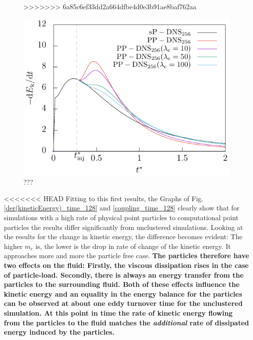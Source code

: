 \documentclass[11pt,a4paper,openany,oneside,parskip=half*]{article}
\begin{document}
\begin{figure}[h]
\begin{minipage}{0.5\textwidth}
	\label{kineticEnergy_time_128}
>>>>>>> 6a85c6ef33dd2a664dfbe4d0e3b91ae8baf762aa
    \end{minipage}%
\begin{minipage}{0.5\textwidth}
        \centering
        \includegraphics[width=\linewidth]{./Abbildungen/256/der(kineticEnergy)_time.pdf}
        \caption{???}
        \label{der_kineticEnergy_256}
    \end{minipage}
\end{figure}
\newline
<<<<<<< HEAD
Fitting to this first results, the Graphs of Fig. \ref{der(kineticEnergy)_time_128} and \ref{coupling_time_128} clearly show that for simulations with a high rate of physical point particles to computational point particles the results differ significantly from unclustered simulations. Looking at the results for the change in kinetic energy, the difference becomes evident: The higher $ m_\mathrm{c} $ is, the lower is the drop in rate of change of the kinetic energy. It approaches more and more the particle free case. 
\newline
\textbf{The particles therefore have two effects on the fluid: Firstly, the viscous dissipation rises in the case of particle-load. Secondly, there is always an energy transfer from the particles to the surrounding fluid. Both of these effects influence the kinetic energy and an equality in the energy balance for the particles can be observed at about one eddy turnover time for the unclustered simulation. At this point in time the rate of kinetic energy flowing from the particles to the fluid matches the \textit{additional} rate of dissipated energy induced by the particles.}
\end{document}
